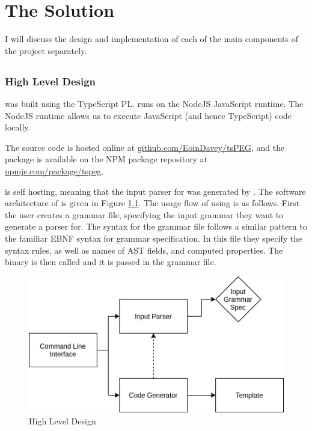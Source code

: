 \chapter{The Solution}

I will discuss the design and implementation of each of the main components of the project separately.

\section{\tsPEG{}}

\subsection{High Level Design}

\tsPEG{} was built using the TypeScript PL. \tsPEG{} runs on the NodeJS JavaScript runtime. The NodeJS runtime allows us to execute JavaScript (and hence TypeScript) code locally.

The source code is hosted online at
\href{https://github.com/EoinDavey/tsPEG}{github.com/EoinDavey/tsPEG}, and the \tsPEG{} package is available on the NPM package repository at \href{https://www.npmjs.com/package/tspeg}{npmjs.com/package/tspeg}.

\tsPEG{} is self hosting, meaning that the input parser for \tsPEG{} was generated by \tsPEG{}. The software architecture of \tsPEG{} is given in Figure \ref{tspegdiagram}. The usage flow of using \tsPEG{} is as follows. First the user creates a grammar file, specifying the input grammar they want to generate a parser for. The syntax for the grammar file follows a similar pattern to the familiar EBNF syntax for grammar specification. In this file they specify the syntax rules, as well as names of AST fields, and computed properties. The \tsPEG{} binary is then called and it is passed in the grammar file.

\begin{figure}
    \caption{\tsPEG{} High Level Design}
    \label{tspegdiagram}
    \begin{center}
    \includegraphics[scale=0.75]{tspegdiagram}
    \end{center}
\end{figure}


